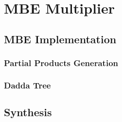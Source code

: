 \chapter{MBE Multiplier}

\section{MBE Implementation}

\subsection{Partial Products Generation}

\subsection{Dadda Tree}

\section{Synthesis}
